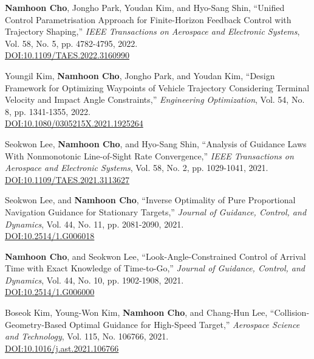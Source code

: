 \begin{enumerate}[itemsep=0.5em, label={[}J\arabic*{]}]
\item \textbf{Namhoon Cho}, Jongho Park, Youdan Kim, and Hyo-Sang Shin, ``Unified Control Parametrisation Approach for Finite-Horizon Feedback Control with Trajectory Shaping,'' \textit{IEEE Transactions on Aerospace and Electronic Systems}, Vol. 58, No. 5, pp. 4782-4795, 2022. \\
\href{https://doi.org/10.1109/TAES.2022.3160990}{DOI:10.1109/TAES.2022.3160990}

\item Youngil Kim, \textbf{Namhoon Cho}, Jongho Park, and Youdan Kim, ``Design Framework for Optimizing Waypoints of Vehicle Trajectory Considering Terminal Velocity and Impact Angle Constraints,'' \textit{Engineering Optimization}, Vol. 54, No. 8, pp. 1341-1355, 2022. \\
\href{https://doi.org/10.1080/0305215X.2021.1925264}{DOI:10.1080/0305215X.2021.1925264}

\item Seokwon Lee, \textbf{Namhoon Cho}, and Hyo-Sang Shin, ``Analysis of Guidance Laws With Nonmonotonic Line-of-Sight Rate Convergence,'' \textit{IEEE Transactions on Aerospace and Electronic Systems}, Vol. 58, No. 2, pp. 1029-1041, 2021. \\
\href{https://doi.org/10.1109/TAES.2021.3113627}{DOI:10.1109/TAES.2021.3113627}

\item Seokwon Lee, and \textbf{Namhoon Cho}, ``Inverse Optimality of Pure Proportional Navigation Guidance for Stationary Targets,'' \textit{Journal of Guidance, Control, and Dynamics}, Vol. 44, No. 11, pp. 2081-2090, 2021. \\
\href{https://doi.org/10.2514/1.G006018}{DOI:10.2514/1.G006018}

\item \textbf{Namhoon Cho}, and Seokwon Lee, ``Look-Angle-Constrained Control of Arrival Time with Exact Knowledge of Time-to-Go,'' \textit{Journal of Guidance, Control, and Dynamics}, Vol. 44, No. 10, pp. 1902-1908, 2021. \\
\href{https://doi.org/10.2514/1.G006000}{DOI:10.2514/1.G006000}

\item Boseok Kim, Young-Won Kim, \textbf{Namhoon Cho}, and Chang-Hun Lee, ``Collision-Geometry-Based Optimal Guidance for High-Speed Target,'' \textit{Aerospace Science and Technology}, Vol. 115, No. 106766, 2021. \\
\href{https://doi.org/10.1016/j.ast.2021.106766}{DOI:10.1016/j.ast.2021.106766}


\end{enumerate}

